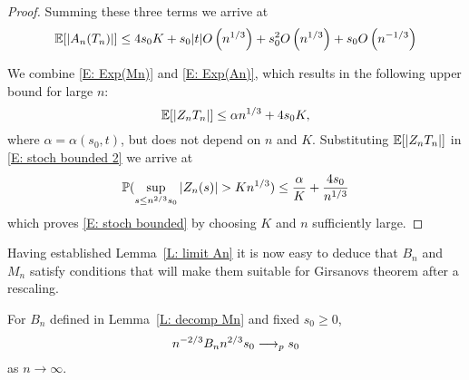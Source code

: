 \begin{proof}
    Summing these three terms we arrive at
    \begin{equation} \label{E: Exp(An)}
    \mathbb{E}[|A_n(T_n)|] \leq 4 s_0 K + s_0|t|O\left(n^{1 / 3}\right) + s_0^2O\left(n^{1 / 3}\right) + s_0O\left(n^{-1 / 3}\right)
    \end{equation}
    
    We combine \eqref{E: Exp(Mn)} and \eqref{E: Exp(An)}, 
    which results in the following upper bound for large $n$:
    \begin{equation} \label{E: bound Zn}
    \mathbb{E}[|Z_n{T_n}|] \leq \alpha n^{1 / 3} + 4s_0K,
    \end{equation}
    where $\alpha = \alpha(s_0,t)$, but does not depend on $n$ and $K$. 
    Substituting $\mathbb{E}[|Z_n{T_n}|]$ in \eqref{E: stoch bounded 2} we arrive at
    \begin{equation}
    \mathbb{P}( \sup_{s\leq n^{2/3} s_0} |Z_n(s)| > K n^{1 / 3} ) \leq \frac{\alpha}{K} + \frac{4s_0}{n^{1 / 3}}
    \end{equation}
    which proves \eqref{E: stoch bounded} by choosing $K$ and $n$ sufficiently large.
\end{proof}

Having established Lemma~\ref{L: limit An} it is now easy to deduce that $B_n$ and $M_n$ satisfy conditions 
that will make them suitable for Girsanovs theorem after a rescaling.

\begin{lemma} \label{L: limit Bn}
	For $B_n$ defined in Lemma~\ref{L: decomp Mn} and fixed $s_0 \geq 0$,
	\begin{equation} \label{E: limit Bn}
	n^{-2 / 3} B_n{n^{2 / 3}s_0} \longrightarrow_p s_0
	\end{equation}
	as $n \rightarrow \infty$.
\end{lemma}


